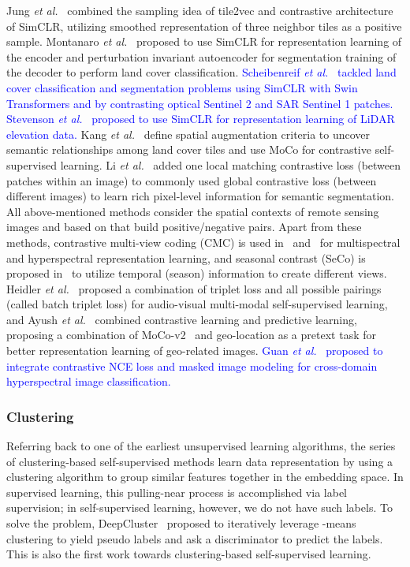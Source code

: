 \documentclass[lettersize,journal]{IEEEtran}
\newcommand{\etal}{\textit{et al.}}
\begin{document}
Jung \etal~\cite{jung2021contrastive} combined the sampling idea of tile2vec and contrastive architecture of SimCLR, utilizing smoothed representation of three neighbor tiles as a positive sample. Montanaro \etal~\cite{montanaro2021self} proposed to use SimCLR for representation learning of the encoder and perturbation invariant autoencoder for segmentation training of the decoder to perform land cover classification. 
\textcolor{blue}{Scheibenreif \etal~\cite{scheibenreif2022self} tackled land cover classification and segmentation problems using SimCLR with Swin Transformers and by contrasting optical Sentinel 2 and SAR Sentinel 1 patches. Stevenson \etal~\cite{stevenson2022deep} proposed to use SimCLR for representation learning of LiDAR elevation data.} 
Kang \etal~\cite{kang2020deep} define spatial augmentation criteria to uncover semantic relationships among land cover tiles and use MoCo for contrastive self-supervised learning. Li \etal~\cite{li2021remote} added one local matching contrastive loss (between patches within an image) to commonly used global contrastive loss (between different images) to learn rich pixel-level information for semantic segmentation. All above-mentioned methods consider the spatial contexts of remote sensing images and based on that build positive/negative pairs. Apart from these methods, contrastive multi-view coding (CMC) is used in~\cite{stojnic2021self,chen2021self1} and~\cite{liu2020deep} for multispectral and hyperspectral representation learning, and seasonal contrast (SeCo) is proposed in~\cite{manas2021seasonal} to utilize temporal (season) information to create different views. Heidler \etal~\cite{heidler2021self} proposed a combination of triplet loss and all possible pairings (called batch triplet loss) for audio-visual multi-modal self-supervised learning, and Ayush \etal~\cite{ayush2020geography} combined contrastive learning and predictive learning, proposing a combination of MoCo-v2~\cite{chen2020improved} and geo-location as a pretext task for better representation learning of geo-related images. 
\textcolor{blue}{Guan \etal~\cite{guan2022cross} proposed to integrate contrastive NCE loss and masked image modeling for cross-domain hyperspectral image classification.}
   
\subsubsection{Clustering}

Referring back to one of the earliest unsupervised learning algorithms, the series of clustering-based self-supervised methods learn data representation by using a clustering algorithm to group similar features together in the embedding space. In supervised learning, this pulling-near process is accomplished via label supervision; in self-supervised learning, however, we do not have such labels. To solve the problem, DeepCluster~\cite{caron2018deep} proposed to iteratively leverage -means clustering to yield pseudo labels and ask a discriminator to predict the labels. This is also the first work towards clustering-based self-supervised learning.
\end{document}
